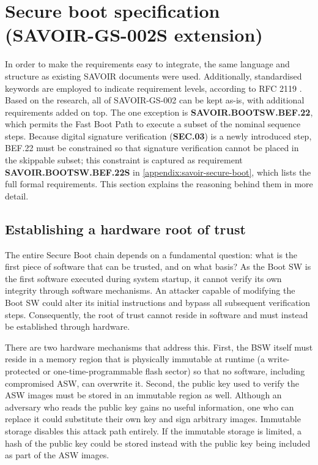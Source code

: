 \section{Secure boot specification (SAVOIR-GS-002S extension)}
\label{section:design-spec}

In order to make the requirements easy to integrate, the same language and structure as existing SAVOIR documents were used. Additionally, standardised keywords are employed to indicate requirement levels, according to RFC 2119 \cite{rfc2119}. Based on the research, all of SAVOIR-GS-002 can be kept as-is, with additional requirements added on top. The one exception is \textbf{SAVOIR.BOOTSW.BEF.22}, which permits the Fast Boot Path to execute a subset of the nominal sequence steps. Because digital signature verification (\textbf{SEC.03}) is a newly introduced step, BEF.22 must be constrained so that signature verification cannot be placed in the skippable subset; this constraint is captured as requirement \textbf{SAVOIR.BOOTSW.BEF.22S} in \autoref{appendix:savoir-secure-boot}, which lists the full formal requirements. This section explains the reasoning behind them in more detail.

\subsection{Establishing a hardware root of trust}

The entire Secure Boot chain depends on a fundamental question: what is the first piece of software that can be trusted, and on what basis? As the Boot SW is the first software executed during system startup, it cannot verify its own integrity through software mechanisms. An attacker capable of modifying the Boot SW could alter its initial instructions and bypass all subsequent verification steps. Consequently, the root of trust cannot reside in software and must instead be established through hardware.

There are two hardware mechanisms that address this. First, the BSW itself must reside in a memory region that is physically immutable at runtime (a write-protected or one-time-programmable flash sector) so that no software, including compromised ASW, can overwrite it. Second, the public key used to verify the ASW images must be stored in an  immutable region as well. Although an adversary who reads the public key gains no useful information, one who can replace it could substitute their own key and sign arbitrary images. Immutable storage disables this attack path entirely. If the immutable storage is limited, a hash of the public key could be stored instead with the public key being included as part of the ASW images.

